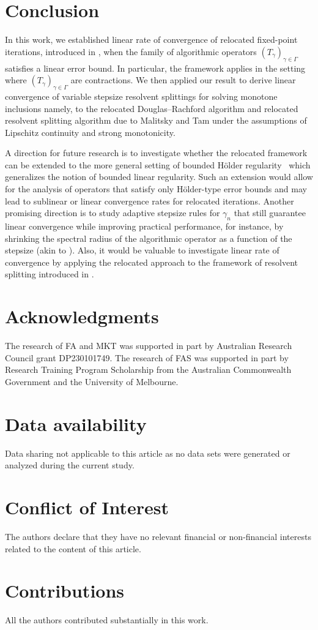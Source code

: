 \documentclass[a4paper,12pt]{article}
\begin{document}
\section{Conclusion}\label{s:conclusion}
In this work, we established linear rate of convergence of relocated fixed-point iterations, introduced in \cite{atenas2025relocated}, when the family of algorithmic operators $(T_{\gamma})_{\gamma\in\Gamma}$ satisfies a linear error bound. In particular, the framework applies in the setting where $(T_{\gamma})_{\gamma\in\Gamma}$ are contractions. We then applied our result to derive linear convergence of variable stepsize resolvent splittings for solving monotone inclusions namely, to the relocated Douglas--Rachford algorithm and relocated resolvent splitting algorithm due to Malitsky and Tam under the assumptions of Lipschitz continuity and strong monotonicity.

A direction for future research is to investigate whether the relocated framework can be extended to the more general setting of bounded H\"older regularity~\cite[Definition~2.7]{borwein2017convergence} which generalizes the notion of bounded linear regularity. Such an extension would allow for the analysis of operators that satisfy only H\"older-type error bounds and may lead to sublinear or linear convergence rates for relocated iterations. Another promising direction is to study adaptive stepsize rules for $\gamma_n$ that still guarantee linear convergence while improving practical performance, for instance, by shrinking the spectral radius of the algorithmic operator as a function of the stepsize (akin to \cite{lorenz2019non}). Also, it would be valuable to investigate linear rate of convergence by applying the relocated approach to the framework of resolvent splitting introduced in \cite{tam2024frugal}.


\section*{Acknowledgments}
The research of FA and MKT was supported in part by Australian Research Council grant DP230101749. The research of FAS was supported in part by Research Training Program Scholarship from the Australian Commonwealth Government and the University of Melbourne.

\section*{Data availability}Data sharing not applicable to this article as no data sets were generated or analyzed during the current study.

\section*{Conflict of Interest}
The authors declare that they have no relevant financial or non-financial interests related to the content of this article.

\section*{Contributions}All the authors contributed substantially in this work.



\end{document}
